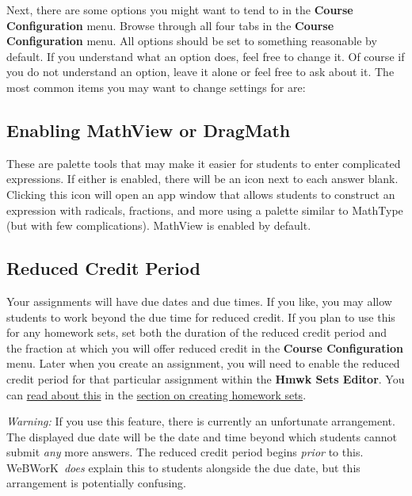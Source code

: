 \documentclass[12pt]{article}
\newcommand{\menu}[1]{\textbf{#1}}
\newcommand{\WW}{WeBWorK}
\newcommand{\HSE}{\menu{Hmwk Sets Editor}}
\newcommand{\FM}{\menu{File Manager}}
\begin{document}

Next, there are some options you might want to tend to in the \menu{Course Configuration} menu.  Browse through all four tabs in the  \menu{Course Configuration} menu. All options should be set to something reasonable by default. If you understand what an option does, feel free to change it. Of course if you do not understand an option, leave it alone or feel free to ask about it. The most common items you may want to change settings for are:

\subsection{Enabling MathView or DragMath}

These are palette tools that may make it easier for students to enter complicated expressions. If either is enabled, there will be an icon next to each answer blank. Clicking this icon will open an app window that allows students to construct an expression with radicals, fractions, and more using a palette similar to MathType (but with few complications). MathView is enabled by default. 

\subsection{Reduced Credit Period}

Your assignments will have due dates and due times. If you like, you may allow students to work beyond the due time for reduced credit. If you plan to use this for any homework sets, set both the duration of the reduced credit period and the fraction at which you will offer reduced credit in the \menu{Course Configuration} menu. Later when you create an assignment, you will need to enable the reduced credit period for that particular assignment within the \HSE. You can \hyperref[reducedcredit]{read about this} in the \hyperref[makeset]{section on creating homework sets}. 

\emph{Warning:} If you use this feature, there is currently an unfortunate arrangement. The displayed due date will be the date and time beyond which students cannot submit \emph{any} more answers. The reduced credit period begins \emph{prior} to this.  \WW\ \emph{does} explain this to students alongside the due date, but this arrangement is potentially confusing.
\end{document}
